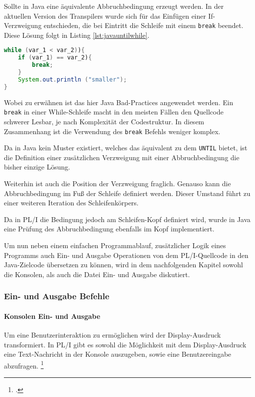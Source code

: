 Sollte in Java eine äquivalente Abbruchbedingung erzeugt werden.
In der aktuellen Version des Transpilers wurde sich für das Einfügen einer If-Verzweigung entschieden, die bei Eintritt die Schleife mit einem \verb+break+ beendet. Diese Lösung folgt in Listing \ref{lst:javauntilwhile}.

\begin{lstlisting}[language=Java, caption=Java Until-Statement, label={lst:javauntilwhile}]
while (var_1 < var_2)){
	if (var_1) == var_2){
		break; 
	}
	System.out.println ("smaller");
}

\end{lstlisting} 

Wobei zu erwähnen ist das hier Java Bad-Practices angewendet werden. Ein \verb+break+ in einer While-Schleife macht in den meisten Fällen den Quellcode schwerer Lesbar, je nach Komplexität der Codestruktur.
In diesem Zusammenhang ist die Verwendung des \verb+break+ Befehls weniger komplex. 

Da in Java kein Muster existiert, welches das äquivalent zu dem \verb+UNTIL+ bietet, ist die Definition einer zusätzlichen Verzweigung mit einer Abbruchbedingung die bisher einzige Lösung.

Weiterhin ist auch die Position der Verzweigung fraglich. Genauso kann die Abbruchbedingung im Fuß der Schleife definiert werden. Dieser Umstand führt zu einer weiteren Iteration des Schleifenkörpers. 

Da in PL/I die Bedingung jedoch am Schleifen-Kopf definiert wird, wurde in Java eine Prüfung des Abbruchbedingung ebenfalls im Kopf implementiert. 

Um nun neben einem einfachen Programmablauf, zusätzlicher Logik eines Programms auch Ein- und Ausgabe Operationen von dem PL/I-Quellcode in den Java-Zielcode übersetzen zu können, wird in dem nachfolgenden Kapitel sowohl die Konsolen, als auch die Datei Ein- und Ausgabe diskutiert.

\pagebreak
\subsubsection{Ein- und Ausgabe Befehle}
\paragraph{Konsolen Ein- und Ausgabe}
Um eine Benutzerinteraktion zu ermöglichen wird der Display-Ausdruck transformiert.
In PL/I gibt es sowohl die Möglichkeit mit dem Display-Ausdruck eine Text-Nachricht in der Konsole auszugeben, sowie eine Benutzereingabe abzufragen. \footcite[Vgl. ][S. 264ff.]{pliref}

